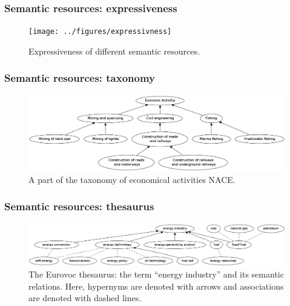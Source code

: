 \begin{frame}
\frametitle{Semantic resources: expressiveness}

\begin{figure}
\centering
\texttt{[image: ../figures/expressivness]}
\caption{ Expressiveness of different semantic resources. }
\label{fig:expressiveness}
\end{figure}

\end{frame}





\begin{frame}
\frametitle{Semantic resources: taxonomy }

\begin{figure}
\centering
\includegraphics[width=1.0\textwidth]{figures/taxonomy-new}
\caption{ A part of the taxonomy of economical activities NACE.}
\label{fig:taxonomy}
\end{figure}

\end{frame}





\begin{frame}
\frametitle{Semantic resources: thesaurus }

\begin{figure}
\centering
\includegraphics[width=1.0\textwidth]{figures/thesaurus-new}
\caption{ The Eurovoc thesaurus: the term ``energy industry'' and its semantic relations. Here, hypernyms are denoted with arrows and associations are denoted with dashed lines.}
\label{fig:thesaurus}
\end{figure}
\end{frame}




